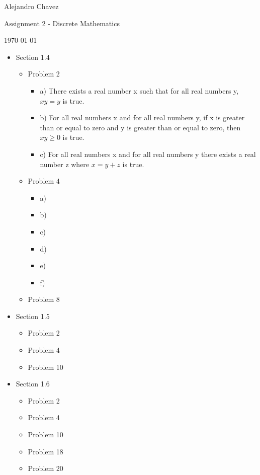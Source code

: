 \documentclass[10pt,a4paper]{article}
\begin{document}
\hfill Alejandro Chavez

\hfill Assignment 2 - Discrete Mathematics

\hfill \today\\

\begin{itemize}
  \item Section 1.4
    \begin{itemize}
      \item Problem 2
        \begin{itemize}
          \item a)
            There exists a real number x such that for all real numbers y, $xy = y$ is true.
          \item b)
            For all real numbers x and for all real numbers y, if x is greater than or equal to zero and y is greater than or equal to zero, then $xy\ge0$ is true.
          \item c)
            For all real numbers x and for all real numbers y there exists a real number z where $x = y + z$ is true.
        \end{itemize}
      \item Problem 4 
        \begin{itemize}
          \item a)
          \item b)
          \item c)
          \item d)
          \item e)
          \item f)
         \end{itemize}
      \item Problem 8
    \end{itemize}
  \item Section 1.5
    \begin{itemize}
      \item Problem 2
      \item Problem 4
      \item Problem 10
    \end{itemize}
  \item Section 1.6
    \begin{itemize}
      \item Problem 2
      \item Problem 4
      \item Problem 10
      \item Problem 18
      \item Problem 20
    \end{itemize}
\end{itemize}
\end{document}
